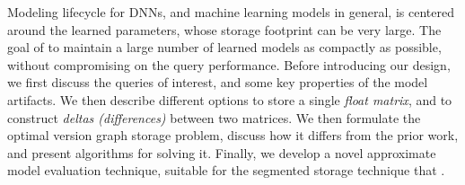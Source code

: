 \documentclass[conference]{IEEEtran}
\begin{document}
Modeling lifecycle for DNNs, and machine learning models in general, is centered around the learned parameters, whose storage footprint can be very large. 
The goal of \weightstore\is to maintain a large number of learned models as compactly as possible, without compromising on the query performance.
Before introducing our design, we first discuss the queries of interest, and some key properties of the model artifacts. 
We then describe different options to store a single {\em float matrix}, and to construct {\em deltas (differences)} between two matrices.
We then formulate the optimal version graph storage problem, discuss how it differs from the prior work, and present algorithms for solving it.
Finally, we develop a novel approximate model evaluation technique, suitable for the segmented storage technique that \weightstore\uses.
%
\end{document}
